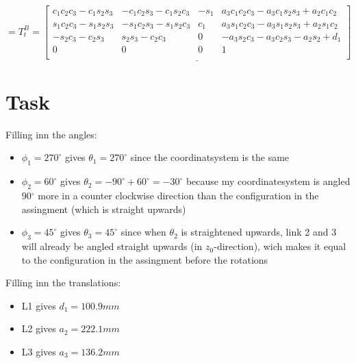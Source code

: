 \documentclass[12pt,norsk,a4paper]{article}
\begin{document}
            \[= T_t^{B} = 
            \underline{\left[ \begin{array}{cccc}
            c_1c_2c_3-c_1s_2s_3 & -c_1c_2s_3-c_1s_2c_3 & -s_1 & a_3c_1c_2c_3-a_3c_1s_2s_3+a_2c_1c_2 \\
            s_1c_2c_3-s_1s_2s_3 & -s_1c_2s_3-s_1s_2c_3 & c_1 & a_3s_1c_2c_3-a_3s_1s_2s_3+a_2s_1c_2 \\
            -s_2c_3-c_2s_3 & s_2s_3-c_2c_3 & 0 & -a_3s_2c_3-a_3c_2s_3-a_2s_2+d_1 \\
            0 & 0 & 0 & 1 \\
            \end{array} \right]}\]


    \newpage
    \section{Task}
    Filling inn the angles:
    \begin{itemize}
        \item $\phi_1 = 270^{\circ}$ gives $\theta_1 = 270^{\circ}$ since the coordinatsystem is the same
        \item $\phi_2 = 60^{\circ}$ gives $\theta_2 = -90^{\circ}+60^{\circ} = -30^{\circ}$ because my coordinatesystem is angled 90$^{\circ}$ more in a counter clockwise direction than the configuration in the assingment (which is straight upwards)
        \item $\phi_3 = 45^{\circ}$ gives $\theta_3 = 45^{\circ}$ since when $\theta_2$ is straightened upwards, link 2 and 3 will already be angled straight upwards (in $z_0$-direction), wich makes it equal to the configuration in the assingment before the rotations
    \end{itemize}
    Filling inn the translations:
    \begin{itemize}
        \item L1 gives $d_1 = 100.9mm$
        \item L2 gives $a_2 = 222.1mm$
        \item L3 gives $a_3 = 136.2mm$
    \end{itemize}
\end{document}
